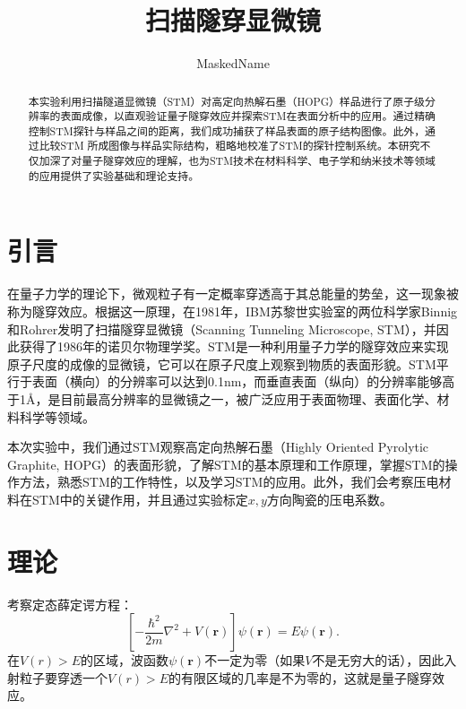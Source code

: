 \documentclass[font=default]{mpltx}
\begin{document}
\title{扫描隧穿显微镜} %
\author{MaskedName} %
\date{}
\begin{abstract}
  本实验利用扫描隧道显微镜（STM）对高定向热解石墨（HOPG）样品进行了原子级分辨率的表面成像，以直观验证量子隧穿效应并探索STM在表面分析中的应用。通过精确控制STM探针与样品之间的距离，我们成功捕获了样品表面的原子结构图像。此外，通过比较STM 所成图像与样品实际结构，粗略地校准了STM的探针控制系统。本研究不仅加深了对量子隧穿效应的理解，也为STM技术在材料科学、电子学和纳米技术等领域的应用提供了实验基础和理论支持。
\end{abstract}

\maketitle

\section{引言}
在量子力学的理论下，微观粒子有一定概率穿透高于其总能量的势垒，这一现象被称为隧穿效应。根据这一原理，在1981年，IBM苏黎世实验室的两位科学家Binnig和Rohrer发明了扫描隧穿显微镜（Scanning Tunneling Microscope, STM），并因此获得了1986年的诺贝尔物理学奖。STM是一种利用量子力学的隧穿效应来实现原子尺度的成像的显微镜，它可以在原子尺度上观察到物质的表面形貌。STM平行于表面（横向）的分辨率可以达到0.1nm，而垂直表面（纵向）的分辨率能够高于1Å，是目前最高分辨率的显微镜之一，被广泛应用于表面物理、表面化学、材料科学等领域。

本次实验中，我们通过STM观察高定向热解石墨（Highly Oriented Pyrolytic Graphite, HOPG）的表面形貌，了解STM的基本原理和工作原理，掌握STM的操作方法，熟悉STM的工作特性，以及学习STM的应用。此外，我们会考察压电材料在STM中的关键作用，并且通过实验标定$x,y$方向陶瓷的压电系数。

\section{理论\cite{book}}
考察定态薛定谔方程：
\begin{equation}
  \left[ -\frac{\hbar^2}{2m} \nabla^2 + V(\bm{r}) \right] \psi(\bm{r}) = E \psi(\bm{r}).
\end{equation}
在$V(r)>E$的区域，波函数$\psi(\bm{r})$不一定为零（如果$V$不是无穷大的话），因此入射粒子要穿透一个$V(r)>E$的有限区域的几率是不为零的，这就是量子隧穿效应。
\end{document}
